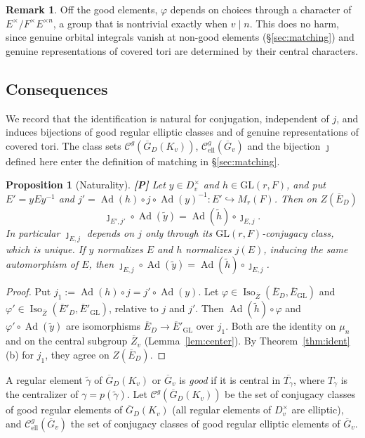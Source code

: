 \documentclass[12pt]{article}
\newcommand{\ov}[1]{\overline{#1}}
\newcommand{\Ad}{\operatorname{Ad}}
\newcommand{\Iso}{\operatorname{Iso}}
\newcommand{\GL}{\mathrm{GL}}
\newcommand{\Gb}{\ov{G}}
\newcommand{\Zb}{\ov{Z}}
\newcommand{\GDb}{\ov{G}_D}
\newcommand{\Eb}{\ov{E}}
\newcommand{\jj}{\jmath}
\newcommand{\Pv}{\textbf{[P]}}
\theoremstyle{plain}
\newtheorem{proposition}[theorem]{Proposition}
\theoremstyle{definition}
\newtheorem{remark}[theorem]{Remark}
\begin{document}
\begin{remark}
Off the good elements, $\varphi$ depends on choices through a character of $E^\times/F^\times E^{\times n}$, a group that is nontrivial exactly when $v\mid n$. This does no harm, since genuine orbital integrals vanish at non-good elements (\S\ref{sec:matching}) and genuine representations of covered tori are determined by their central characters.
\end{remark}

\subsection{Consequences}\label{subsec:cons}
We record that the identification is natural for conjugation, independent of $j$, and induces bijections of good regular elliptic classes and of genuine representations of covered tori. The class sets $\mathcal C^{g}(\GDb(K_v))$, $\mathcal C^{g}_{\mathrm{ell}}(\Gb_v)$ and the bijection $\jj$ defined here enter the definition of matching in \S\ref{sec:matching}.

\begin{proposition}[Naturality]\label{prop:natural}\Pv
Let $y\in D_v^\times$ and $h\in\GL(r,F)$, and put $E'=yEy^{-1}$ and $j'=\Ad(h)\circ j\circ\Ad(y)^{-1}:E'\hookrightarrow M_r(F)$. Then on $Z(\Eb_D)$
\[ \jj_{E',j'}\circ\Ad(\tilde y)=\Ad(\tilde h)\circ\jj_{E,j}. \]
In particular $\jj_{E,j}$ depends on $j$ only through its $\GL(r,F)$-conjugacy class, which is unique. If $y$ normalizes $E$ and $h$ normalizes $j(E)$, inducing the same automorphism of $E$, then $\jj_{E,j}\circ\Ad(\tilde y)=\Ad(\tilde h)\circ\jj_{E,j}$.
\end{proposition}
\begin{proof}
Put $j_1:=\Ad(h)\circ j=j'\circ\Ad(y)$. Let $\varphi\in\Iso_{\Zb}(\Eb_D,\Eb_{\GL})$ and $\varphi'\in\Iso_{\Zb}(\Eb'_D,\Eb'_{\GL})$, relative to $j$ and $j'$. Then $\Ad(\tilde h)\circ\varphi$ and $\varphi'\circ\Ad(\tilde y)$ are isomorphisms $\Eb_D\to\Eb'_{\GL}$ over $j_1$. Both are the identity on $\mu_n$ and on the central subgroup $\Zb_v$ (Lemma~\ref{lem:center}). By Theorem~\ref{thm:ident}(b) for $j_1$, they agree on $Z(\Eb_D)$.
\end{proof}

A regular element $\tilde\gamma$ of $\GDb(K_v)$ or $\Gb_v$ is \emph{good} if it is central in $\ov{T_\gamma}$, where $T_\gamma$ is the centralizer of $\gamma=p(\tilde\gamma)$. Let $\mathcal C^{g}(\GDb(K_v))$ be the set of conjugacy classes of good regular elements of $\GDb(K_v)$ (all regular elements of $D_v^\times$ are elliptic), and $\mathcal C^{g}_{\mathrm{ell}}(\Gb_v)$ the set of conjugacy classes of good regular elliptic elements of $\Gb_v$.
\end{document}
